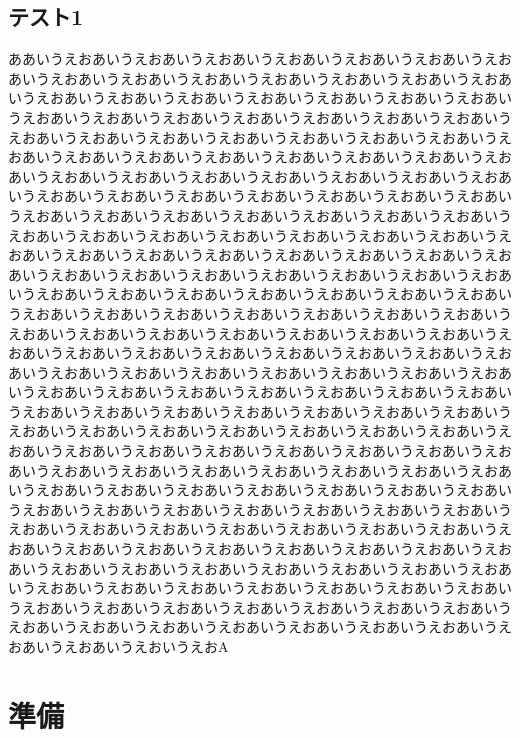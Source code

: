 \documentclass[a4paper,12pt]{jreport}
\begin{document}
\section{テスト1}
ああいうえおあいうえおあいうえおあいうえおあいうえおあいうえおあいうえおあいうえおあいうえおあいうえおあいうえおあいうえおあいうえおあいうえおあいうえおあいうえおあいうえおあいうえおあいうえおあいうえおあいうえおあいうえおあいうえおあいうえおあいうえおあいうえおあいうえおあいうえおあいうえおあいうえおあいうえおあいうえおあいうえおあいうえおあいうえおあいうえおあいうえおあいうえおあいうえおあいうえおあいうえおあいうえおあいうえおあいうえおあいうえおあいうえおあいうえおあいうえおあいうえおあいうえおあいうえおあいうえおあいうえおあいうえおあいうえおあいうえおあいうえおあいうえおあいうえおあいうえおあいうえおあいうえおあいうえおあいうえおあいうえおあいうえおあいうえおあいうえおあいうえおあいうえおあいうえおあいうえおあいうえおあいうえおあいうえおあいうえおあいうえおあいうえおあいうえおあいうえおあいうえおあいうえおあいうえおあいうえおあいうえおあいうえおあいうえおあいうえおあいうえおあいうえおあいうえおあいうえおあいうえおあいうえおあいうえおあいうえおあいうえおあいうえおあいうえおあいうえおあいうえおあいうえおあいうえおあいうえおあいうえおあいうえおあいうえおあいうえおあいうえおあいうえおあいうえおあいうえおあいうえおあいうえおあいうえおあいうえおあいうえおあいうえおあいうえおあいうえおあいうえおあいうえおあいうえおあいうえおあいうえおあいうえおあいうえおあいうえおあいうえおあいうえおあいうえおあいうえおあいうえおあいうえおあいうえおあいうえおあいうえおあいうえおあいうえおあいうえおあいうえおあいうえおあいうえおあいうえおあいうえおあいうえおあいうえおあいうえおあいうえおあいうえおあいうえおあいうえおあいうえおあいうえおあいうえおあいうえおあいうえおあいうえおあいうえおあいうえおあいうえおあいうえおあいうえおあいうえおあいうえおあいうえおあいうえおあいうえおあいうえおあいうえおあいうえおあいうえおあいうえおあいうえおあいうえおあいうえおあいうえおあいうえおあいうえおあいうえおあいうえおあいうえおあいうえおあいうえおあいうえおあいうえおあいうえおあいうえおあいうえおあいうえおあいうえおあいうえおあいうえおあいうえおあいうえおあいうえおあいうえおあいうえおあいうえおあいうえおあいうえおあいうえおあいうえおあいうえおあいうえおあいうえおあいうえおあいうえおあいうえおあいうえおあいうえおあいうえおあいうえおあいうえおあいうえおあいうえおあいうえおあいうえおいうえおA

\chapter{準備}
\end{document}
